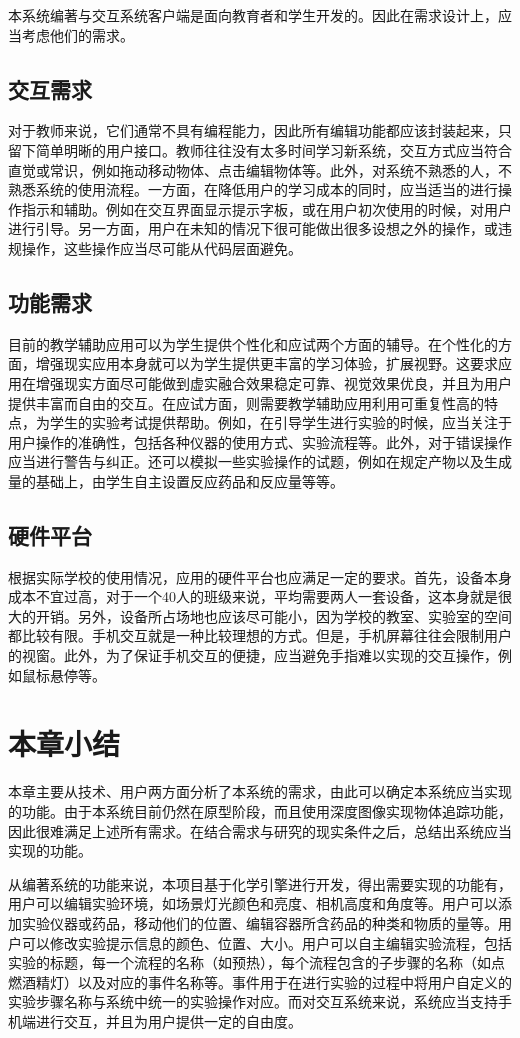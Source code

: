 本系统编著与交互系统客户端是面向教育者和学生开发的。因此在需求设计上，应当考虑他们的需求。

\subsection{交互需求}
对于教师来说，它们通常不具有编程能力，因此所有编辑功能都应该封装起来，只留下简单明晰的用户接口。教师往往没有太多时间学习新系统，交互方式应当符合直觉或常识，例如拖动移动物体、点击编辑物体等。此外，对系统不熟悉的人，不熟悉系统的使用流程。一方面，在降低用户的学习成本的同时，应当适当的进行操作指示和辅助。例如在交互界面显示提示字板，或在用户初次使用的时候，对用户进行引导。另一方面，用户在未知的情况下很可能做出很多设想之外的操作，或违规操作，这些操作应当尽可能从代码层面避免。

\subsection{功能需求}
目前的教学辅助应用可以为学生提供个性化和应试两个方面的辅导。在个性化的方面，增强现实应用本身就可以为学生提供更丰富的学习体验，扩展视野。这要求应用在增强现实方面尽可能做到虚实融合效果稳定可靠、视觉效果优良，并且为用户提供丰富而自由的交互。在应试方面，则需要教学辅助应用利用可重复性高的特点，为学生的实验考试提供帮助。例如，在引导学生进行实验的时候，应当关注于用户操作的准确性，包括各种仪器的使用方式、实验流程等。此外，对于错误操作应当进行警告与纠正。还可以模拟一些实验操作的试题，例如在规定产物以及生成量的基础上，由学生自主设置反应药品和反应量等等。

\subsection{硬件平台}
根据实际学校的使用情况，应用的硬件平台也应满足一定的要求。首先，设备本身成本不宜过高，对于一个40人的班级来说，平均需要两人一套设备，这本身就是很大的开销。另外，设备所占场地也应该尽可能小，因为学校的教室、实验室的空间都比较有限。手机交互就是一种比较理想的方式。但是，手机屏幕往往会限制用户的视窗。此外，为了保证手机交互的便捷，应当避免手指难以实现的交互操作，例如鼠标悬停等。


\section{本章小结}
本章主要从技术、用户两方面分析了本系统的需求，由此可以确定本系统应当实现的功能。由于本系统目前仍然在原型阶段，而且使用深度图像实现物体追踪功能，因此很难满足上述所有需求。在结合需求与研究的现实条件之后，总结出系统应当实现的功能。

从编著系统的功能来说，本项目基于化学引擎进行开发，得出需要实现的功能有，用户可以编辑实验环境，如场景灯光颜色和亮度、相机高度和角度等。用户可以添加实验仪器或药品，移动他们的位置、编辑容器所含药品的种类和物质的量等。用户可以修改实验提示信息的颜色、位置、大小。用户可以自主编辑实验流程，包括实验的标题，每一个流程的名称（如预热），每个流程包含的子步骤的名称（如点燃酒精灯）以及对应的事件名称等。事件用于在进行实验的过程中将用户自定义的实验步骤名称与系统中统一的实验操作对应。而对交互系统来说，系统应当支持手机端进行交互，并且为用户提供一定的自由度。
